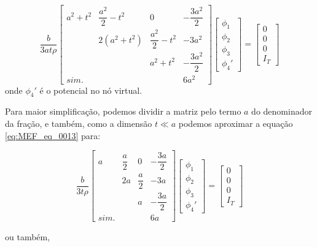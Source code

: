 \documentclass[
12pt,
a4paper,
oneside,
chapter=TITLE,
sumario=tradicional
]{abntex2}
\begin{document}
\begin{equation}
	\frac{b}{3 a t \rho}
	\begin{bmatrix}
		a^2 + t^2 & \dfrac{a^2}{2} - t^2 & 0 & -\dfrac{3a^2}{2} \\
		& 2(a^2 + t^2) & \dfrac{a^2}{2} - t^2 & -3a^2 \\
		&              & a^2 + t^2 & -\dfrac{3a^2}{2} \\
	sim.	&              &           & 6a^2
	\end{bmatrix}
	\begin{bmatrix}
		\phi_1 \\
		\phi_2 \\
		\phi_3 \\
		\phi_4'
	\end{bmatrix}
	=
	\begin{bmatrix}
		0 \\
		0 \\
		0 \\
		I_T
	\end{bmatrix}
	\label{eq:MEF_eq_0013} 
\end{equation}
onde $\phi_4'$ é o potencial no nó virtual.

Para maior simplificação, podemos dividir a matriz pelo termo $a$ do denominador da fração, e também, como a dimensão $t \ll a$ podemos aproximar a equação \ref{eq:MEF_eq_0013} para:


\begin{equation}
	\frac{b}{3t\rho}
	\begin{bmatrix}
		a & \dfrac{a}{2} & 0 & -\dfrac{3a}{2} \\
		& 2a & \dfrac{a}{2} & -3a \\
		&     & a & -\dfrac{3a}{2} \\
	sim.	&     &     & 6a
	\end{bmatrix}
	\begin{bmatrix}
		\phi_1 \\
		\phi_2 \\
		\phi_3 \\
		\phi_4'
	\end{bmatrix}
	=
	\begin{bmatrix}
		0 \\
		0 \\
		0 \\
		I_T
	\end{bmatrix}
	\label{eq:MEF_eq_0014}
\end{equation}

ou também,
\end{document}
